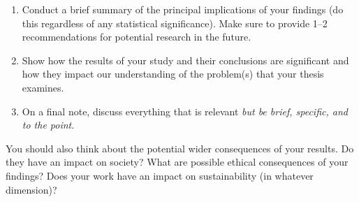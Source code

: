 \begin{enumerate}
    \item Conduct a brief summary of the principal implications of your findings (do this regardless of any statistical significance). Make sure to provide 1--2 recommendations for potential research in the future.
    \item Show how the results of your study and their conclusions are significant and how they impact our understanding of the problem(s) that your thesis examines.
    \item On a final note, discuss everything that is relevant \emph{but be brief, specific, and to the point}.
\end{enumerate}
    

You should also think about the potential wider consequences of your results. Do they have an impact on society? What are possible ethical consequences of your findings? Does your work have an impact on sustainability (in whatever dimension)?